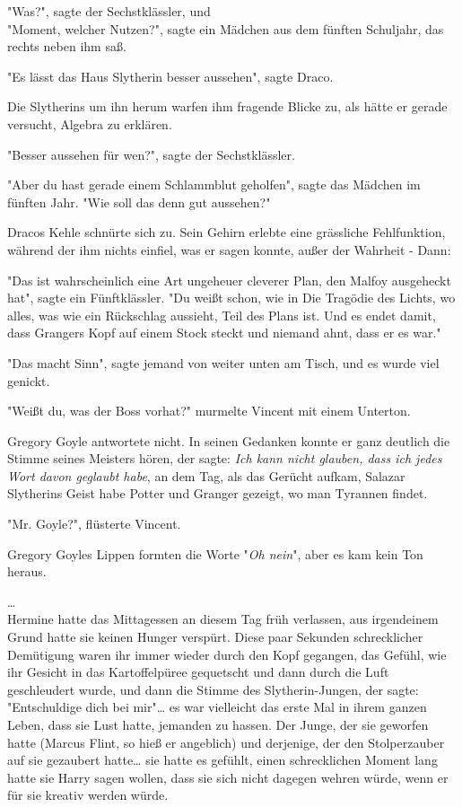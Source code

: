 {"Was?", sagte der Sechstklässler, und\\ "Moment, welcher Nutzen?", sagte ein Mädchen aus dem fünften Schuljahr, das rechts neben ihm saß.

"Es lässt das Haus Slytherin besser aussehen", sagte Draco.

Die Slytherins um ihn herum warfen ihm fragende Blicke zu, als hätte er gerade versucht, Algebra zu erklären.

"Besser aussehen für wen?", sagte der Sechstklässler.

"Aber du hast gerade einem Schlammblut geholfen", sagte das Mädchen im fünften Jahr. "Wie soll das denn gut aussehen?"

Dracos Kehle schnürte sich zu. Sein Gehirn erlebte eine grässliche Fehlfunktion, während der ihm nichts einfiel, was er sagen konnte, außer der Wahrheit - Dann:

"Das ist wahrscheinlich eine Art ungeheuer cleverer Plan, den Malfoy ausgeheckt hat", sagte ein Fünftklässler. "Du weißt schon, wie in Die Tragödie des Lichts, wo alles, was wie ein Rückschlag aussieht, Teil des Plans ist. Und es endet damit, dass Grangers Kopf auf einem Stock steckt und niemand ahnt, dass er es war."

"Das macht Sinn", sagte jemand von weiter unten am Tisch, und es wurde viel genickt.

"Weißt du, was der Boss vorhat?" murmelte Vincent mit einem Unterton.

Gregory Goyle antwortete nicht. In seinen Gedanken konnte er ganz deutlich die Stimme seines Meisters hören, der sagte: \emph{Ich kann nicht glauben, dass ich jedes Wort davon geglaubt habe}, an dem Tag, als das Gerücht aufkam, Salazar Slytherins Geist habe Potter und Granger gezeigt, wo man Tyrannen findet.

"Mr. Goyle?", flüsterte Vincent.

Gregory Goyles Lippen formten die Worte "\emph{Oh nein}", aber es kam kein Ton heraus.

…\\ Hermine hatte das Mittagessen an diesem Tag früh verlassen, aus irgendeinem Grund hatte sie keinen Hunger verspürt. Diese paar Sekunden schrecklicher Demütigung waren ihr immer wieder durch den Kopf gegangen, das Gefühl, wie ihr Gesicht in das Kartoffelpüree gequetscht und dann durch die Luft geschleudert wurde, und dann die Stimme des Slytherin-Jungen, der sagte: "Entschuldige dich bei mir"… es war vielleicht das erste Mal in ihrem ganzen Leben, dass sie Lust hatte, jemanden zu hassen. Der Junge, der sie geworfen hatte (Marcus Flint, so hieß er angeblich) und derjenige, der den Stolperzauber auf sie gezaubert hatte… sie hatte es gefühlt, einen schrecklichen Moment lang hatte sie Harry sagen wollen, dass sie sich nicht dagegen wehren würde, wenn er für sie kreativ werden würde.

}

